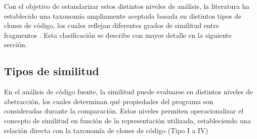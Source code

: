Con el objetivo de estandarizar estos distintos niveles de análisis, la literatura ha establecido una taxonomía ampliamente aceptada basada en distintos tipos de clones de código, los cuales reflejan diferentes grados de similitud entre fragmentos \cite{Bellon2007Comparison}. Esta clasificación se describe con mayor detalle en la siguiente sección.

\subsection{Tipos de similitud}

En el análisis de código fuente, la similitud puede evaluarse en distintos niveles de abstracción, los cuales determinan qué propiedades del programa son consideradas durante la comparación. Estos niveles permiten operacionalizar el concepto de similitud en función de la representación utilizada, estableciendo una relación directa con la taxonomía de clones de código (Tipo I a IV) \cite{Roy2007Survey, Lu2026CSSG}

